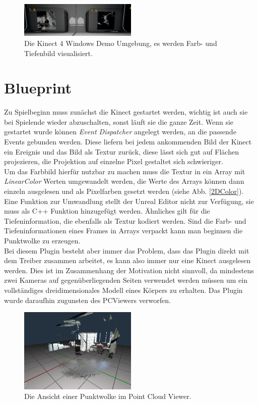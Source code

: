 \documentclass[a4paper]{IEEEtran}
\begin{document}
	\begin{figure}[!h]
    	\centering
		\includegraphics[width=0.5\textwidth]{img/Kinect4Windows}
	    \caption{Die Kinect 4 Windows Demo Umgebung, es werden Farb- und Tiefenbild visualisiert.}
    	\label{Kinect4Windows}
	\end{figure}

\section{Blueprint}
	Zu Spielbeginn muss zunächst die Kinect gestartet werden, wichtig ist auch sie bei Spielende wieder abzuschalten, sonst läuft sie die ganze Zeit. 
	Wenn sie gestartet wurde können {\textit{Event Dispatcher}} angelegt werden, an die passende Events gebunden werden. 
	Diese liefern bei jedem ankommenden Bild der Kinect ein Ereignis und das Bild als Textur zurück, diese lässt sich gut auf Flächen projezieren, die Projektion auf einzelne Pixel gestaltet sich schwieriger. \\
	Um das Farbbild hierfür nutzbar zu machen muss die Textur in ein Array mit {\textit{LinearColor}} Werten umgewandelt werden, die Werte des Arrays können dann einzeln ausgelesen und als Pixelfarben gesetzt werden (siehe Abb. \ref{2DColor}). 
	Eine Funktion zur Umwandlung stellt der Unreal Editor nicht zur Verfügung, sie muss als C++ Funktion hinzugefügt werden. 
	Ähnliches gilt für die Tiefeninformation, die ebenfalls als Textur kodiert werden. 
	Sind die Farb- und Tiefeninformationen eines Frames in Arrays verpackt kann man beginnen die Punktwolke zu erzeugen.\\
	Bei diesem Plugin besteht aber immer das Problem, dass das Plugin direkt mit dem Treiber zusammen arbeitet, es kann also immer nur eine Kinect ausgelesen werden. 
	Dies ist im Zusammenhang der Motivation nicht sinnvoll, da mindestens zwei Kameras auf gegenüberliegenden Seiten verwendet werden müssen um ein vollständiges dreidimensionales Modell eines Körpers zu erhalten.
	Das Plugin wurde daraufhin zugunsten des PCViewers verworfen.\\

	\begin{figure}[!h]
    	\centering
		\includegraphics[width=0.5\textwidth]{img/CloudPCViewer}
	    \caption{Die Ansicht einer Punktwolke im Point Cloud Viewer.}
    	\label{CloudPCViewer}
	\end{figure}
	
\end{document}
